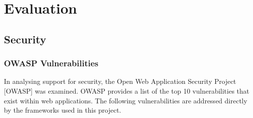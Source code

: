 \chapter{Evaluation}
\label{evaluation}

\section{Security}

\subsection{OWASP Vulnerabilities}

In analysing support for security, the Open Web Application Security Project [OWASP] was examined. OWASP provides a list of the top 10 vulnerabilities that exist within web applications. The following vulnerabilities are addressed directly by the frameworks used in this project.

